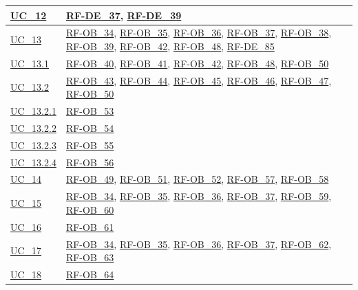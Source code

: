 \begin{longtable}{|
        >{\raggedright\arraybackslash}p{} |
        >{\raggedright\arraybackslash}p{} |
    }
    \hyperref[uc_12]{UC\_12} & \hyperlink{rf-de_37}{RF-DE\_37}, \hyperlink{rf-de_39}{RF-DE\_39} \\
    \hline

    \hyperref[uc_13]{UC\_13} & \hyperlink{rf-ob_34}{RF-OB\_34}, \hyperlink{rf-ob_35}{RF-OB\_35}, \hyperlink{rf-ob_36}{RF-OB\_36}, \hyperlink{rf-ob_37}{RF-OB\_37}, \hyperlink{rf-ob_38}{RF-OB\_38}, \hyperlink{rf-ob_39}{RF-OB\_39}, \hyperlink{rf-ob_42}{RF-OB\_42}, \hyperlink{rf-ob_48}{RF-OB\_48}, \hyperlink{rf-de_85}{RF-DE\_85} \\
    \hline
    \hyperref[uc_13.1]{UC\_13.1} & \hyperlink{rf-ob_40}{RF-OB\_40}, \hyperlink{rf-ob_41}{RF-OB\_41}, \hyperlink{rf-ob_42}{RF-OB\_42}, \hyperlink{rf-ob_48}{RF-OB\_48}, \hyperlink{rf-ob_50}{RF-OB\_50} \\
    \hline
    \hyperref[uc_13.2]{UC\_13.2} & \hyperlink{rf-ob_43}{RF-OB\_43}, \hyperlink{rf-ob_44}{RF-OB\_44}, \hyperlink{rf-ob_45}{RF-OB\_45}, \hyperlink{rf-ob_46}{RF-OB\_46}, \hyperlink{rf-ob_47}{RF-OB\_47}, \hyperlink{rf-ob_50}{RF-OB\_50} \\
    \hline
    \hyperref[uc_13.2.1]{UC\_13.2.1} & \hyperlink{rf-ob_53}{RF-OB\_53} \\
    \hline
    \hyperref[uc_13.2.2]{UC\_13.2.2} & \hyperlink{rf-ob_54}{RF-OB\_54} \\
    \hline
    \hyperref[uc_13.2.3]{UC\_13.2.3} & \hyperlink{rf-ob_55}{RF-OB\_55} \\
    \hline
    \hyperref[uc_13.2.4]{UC\_13.2.4} & \hyperlink{rf-ob_56}{RF-OB\_56} \\
    \hline

    \hyperref[uc_14]{UC\_14} & \hyperlink{rf-ob_49}{RF-OB\_49}, \hyperlink{rf-ob_51}{RF-OB\_51}, \hyperlink{rf-ob_52}{RF-OB\_52}, \hyperlink{rf-ob_57}{RF-OB\_57}, \hyperlink{rf-ob_58}{RF-OB\_58} \\
    \hline

    \hyperref[uc_15]{UC\_15} & \hyperlink{rf-ob_34}{RF-OB\_34}, \hyperlink{rf-ob_35}{RF-OB\_35}, \hyperlink{rf-ob_36}{RF-OB\_36}, \hyperlink{rf-ob_37}{RF-OB\_37}, \hyperlink{rf-ob_59}{RF-OB\_59}, \hyperlink{rf-ob_60}{RF-OB\_60} \\
    \hline
    \hyperref[uc_16]{UC\_16} & \hyperlink{rf-ob_61}{RF-OB\_61} \\
    \hline
    \hyperref[uc_17]{UC\_17} & \hyperlink{rf-ob_34}{RF-OB\_34}, \hyperlink{rf-ob_35}{RF-OB\_35}, \hyperlink{rf-ob_36}{RF-OB\_36}, \hyperlink{rf-ob_37}{RF-OB\_37}, \hyperlink{rf-ob_62}{RF-OB\_62}, \hyperlink{rf-ob_63}{RF-OB\_63} \\
    \hline
    \hyperref[uc_18]{UC\_18} & \hyperlink{rf-ob_64}{RF-OB\_64} \\
    \hline


\end{longtable}
